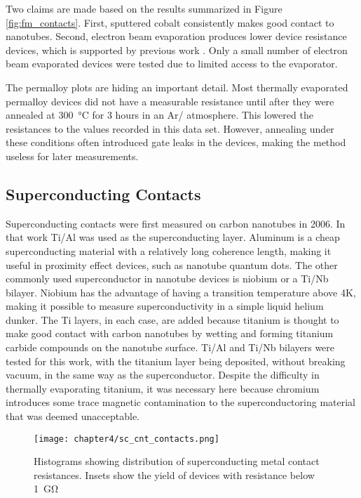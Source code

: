 Two claims are made based on the results summarized in Figure \ref{fig:fm_contacts}. First, sputtered cobalt consistently makes good contact to nanotubes. Second, electron beam evaporation produces lower device resistance devices, which is supported by previous work \cite{Churchill2012}. Only a small number of electron beam evaporated devices were tested due to limited access to the evaporator.

The permalloy plots are hiding an important detail. Most thermally evaporated permalloy devices did not have a measurable resistance until after they were annealed at \SI{300}{\celsius} for 3 hours in an Ar/ atmosphere. This lowered the resistances to the values recorded in this data set. However, annealing under these conditions often introduced gate leaks in the devices, making the method useless for later measurements.

\subsection{Superconducting Contacts}

Superconducting contacts were first measured on carbon nanotubes in 2006. In that work Ti/Al was used as the superconducting layer. Aluminum is a cheap superconducting material with a relatively long coherence length, making it useful in proximity effect devices, such as nanotube quantum dots. The other commonly used superconductor in nanotube devices is niobium or a Ti/Nb bilayer. Niobium has the advantage of having a transition temperature above 4K, making it possible to measure superconductivity in a simple liquid helium dunker. The Ti layers, in each case, are added because titanium is thought to make good contact with carbon nanotubes by wetting and forming titanium carbide compounds on the nanotube surface. Ti/Al and Ti/Nb bilayers were tested for this work, with the titanium layer being deposited, without breaking vacuum, in the same way as the superconductor. Despite the difficulty in thermally evaporating titanium, it was necessary here because chromium introduces some trace magnetic contamination to the superconductoring material that was deemed unacceptable.

\begin{figure}
    \centering
    \texttt{[image: chapter4/sc\_cnt\_contacts.png]}
    \caption{Histograms showing distribution of superconducting metal contact resistances. Insets show the yield of devices with resistance below \SI{1}{\giga\ohm}}
    \label{fig:sc_contacts}
\end{figure}

